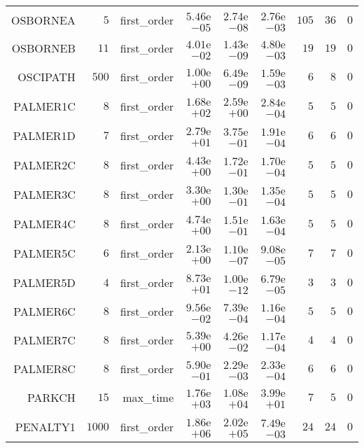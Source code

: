 \begin{longtable}{rrrrrrrrr}
OSBORNEA & \(     5\) & first\_order & \( 5.46\)e\(-05\) & \( 2.74\)e\(-08\) & \( 2.76\)e\(-03\) & \(   105\) & \(    36\) & \(     0\) \\
OSBORNEB & \(    11\) & first\_order & \( 4.01\)e\(-02\) & \( 1.43\)e\(-09\) & \( 4.80\)e\(-03\) & \(    19\) & \(    19\) & \(     0\) \\
OSCIPATH & \(   500\) & first\_order & \( 1.00\)e\(+00\) & \( 6.49\)e\(-09\) & \( 1.59\)e\(-03\) & \(     6\) & \(     8\) & \(     0\) \\
PALMER1C & \(     8\) & first\_order & \( 1.68\)e\(+02\) & \( 2.59\)e\(+00\) & \( 2.84\)e\(-04\) & \(     5\) & \(     5\) & \(     0\) \\
PALMER1D & \(     7\) & first\_order & \( 2.79\)e\(+01\) & \( 3.75\)e\(-01\) & \( 1.91\)e\(-04\) & \(     6\) & \(     6\) & \(     0\) \\
PALMER2C & \(     8\) & first\_order & \( 4.43\)e\(+00\) & \( 1.72\)e\(-01\) & \( 1.70\)e\(-04\) & \(     5\) & \(     5\) & \(     0\) \\
PALMER3C & \(     8\) & first\_order & \( 3.30\)e\(+00\) & \( 1.30\)e\(-01\) & \( 1.35\)e\(-04\) & \(     5\) & \(     5\) & \(     0\) \\
PALMER4C & \(     8\) & first\_order & \( 4.74\)e\(+00\) & \( 1.51\)e\(-01\) & \( 1.63\)e\(-04\) & \(     5\) & \(     5\) & \(     0\) \\
PALMER5C & \(     6\) & first\_order & \( 2.13\)e\(+00\) & \( 1.10\)e\(-07\) & \( 9.08\)e\(-05\) & \(     7\) & \(     7\) & \(     0\) \\
PALMER5D & \(     4\) & first\_order & \( 8.73\)e\(+01\) & \( 1.00\)e\(-12\) & \( 6.79\)e\(-05\) & \(     3\) & \(     3\) & \(     0\) \\
PALMER6C & \(     8\) & first\_order & \( 9.56\)e\(-02\) & \( 7.39\)e\(-04\) & \( 1.16\)e\(-04\) & \(     5\) & \(     5\) & \(     0\) \\
PALMER7C & \(     8\) & first\_order & \( 5.39\)e\(+00\) & \( 4.26\)e\(-02\) & \( 1.17\)e\(-04\) & \(     4\) & \(     4\) & \(     0\) \\
PALMER8C & \(     8\) & first\_order & \( 5.90\)e\(-01\) & \( 2.29\)e\(-03\) & \( 2.33\)e\(-04\) & \(     6\) & \(     6\) & \(     0\) \\
PARKCH & \(    15\) & max\_time & \( 1.76\)e\(+03\) & \( 1.08\)e\(+04\) & \( 3.99\)e\(+01\) & \(     7\) & \(     5\) & \(     0\) \\
PENALTY1 & \(  1000\) & first\_order & \( 1.86\)e\(+06\) & \( 2.02\)e\(+05\) & \( 7.49\)e\(-03\) & \(    24\) & \(    24\) & \(     0\) \\

\end{longtable}
